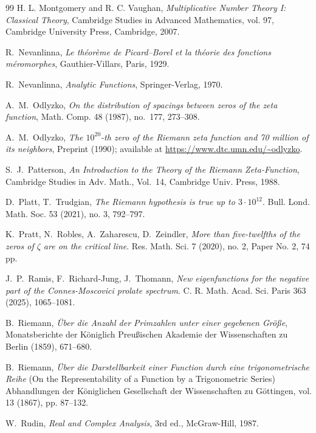 \documentclass{article}
\begin{document}
\begin{thebibliography}{99}
H. L. Montgomery and R. C. Vaughan, 
\emph{Multiplicative Number Theory I: Classical Theory}, 
Cambridge Studies in Advanced Mathematics, vol. 97, 
Cambridge University Press, Cambridge, 2007.


R.~Nevanlinna, 
\emph{Le théorème de Picard--Borel et la théorie des fonctions méromorphes}, 
Gauthier-Villars, Paris, 1929.

R.~Nevanlinna, 
\emph{Analytic Functions}, 
Springer-Verlag, 1970.

A.~M.~Odlyzko, 
\emph{On the distribution of spacings between zeros of the zeta function}, 
Math. Comp. 48 (1987), no.~177, 273--308.

A.~M.~Odlyzko, 
\emph{The $10^{20}$-th zero of the Riemann zeta function and 70 million of its neighbors}, 
Preprint (1990); available at \url{https://www.dtc.umn.edu/~odlyzko}.

S.~J.~Patterson,  
\emph{An Introduction to the Theory of the Riemann Zeta-Function}, 
Cambridge Studies in Adv. Math., Vol.~14, Cambridge Univ. Press, 1988.

 D.~Platt, T.~Trudgian,  \emph{ The Riemann hypothesis is true up to $3 \cdot 10^{12}$}. Bull. Lond. Math. Soc. 53 (2021), no. 3, 792--797.

 K.~Pratt, N.~Robles, A.~Zaharescu, D.~Zeindler, \emph{ More than five-twelfths of the zeros of $\zeta$ are on the critical line}. Res. Math. Sci. 7 (2020), no. 2, Paper No. 2, 74 pp.

 J.~P.~Ramis, F.~Richard-Jung,  J.~Thomann, \emph{New eigenfunctions for the negative part of the Connes-Moscovici prolate spectrum}. C. R. Math. Acad. Sci. Paris 363 (2025), 1065--1081.

B.~Riemann, 
\emph{Über die Anzahl der Primzahlen unter einer gegebenen Größe}, 
Monatsberichte der Königlich Preußischen Akademie der Wissenschaften zu Berlin (1859), 671--680.

B.~Riemann, 
\emph{Über die Darstellbarkeit einer Function durch eine trigonometrische Reihe} (On the Representability of a Function by a Trigonometric Series) Abhandlungen der Königlichen Gesellschaft der Wissenschaften zu Göttingen, vol. 13 (1867), pp. 87--132.

W.~Rudin, 
\emph{Real and Complex Analysis}, 3rd ed., McGraw-Hill, 1987.


\end{thebibliography}
\end{document}
